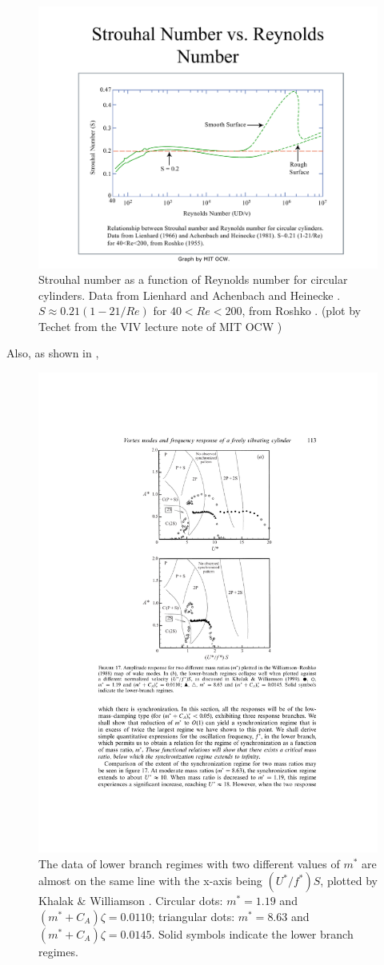 \begin{figure}
	\centering
	\includegraphics[width=0.9\linewidth]{Figs/StrouhalvsRe}
	\caption{Strouhal number as a function of Reynolds number for circular cylinders. Data from Lienhard \cite{Lienhard1966} and Achenbach and Heinecke \cite{Achenbach2006}. $S\approx0.21 (1-21/Re)$ for $40<Re<200$, from Roshko \cite{roshko1955some}. (plot by Techet \cite{Techet2005} from the VIV lecture note of MIT OCW )}
	\label{fig:strouhalvsre}
\end{figure}
Also, as shown in ,
\begin{figure}
	\centering
	\includegraphics[width=0.7\linewidth]{"Figs/A vs UfS"}
	\caption{The data of lower branch regimes with two different values of $m^*$ are almost on the same line with the x-axis being $(U^*/f^*)S$, plotted by Khalak \& Williamson \cite{KHALAK1999}. Circular dots: $m^*=1.19$ and $(m^* + C_A)\zeta = 0.0110$; triangular dots: $m^* = 8.63$ and $(m^* + C_A)\zeta = 0.0145$. Solid symbols indicate the lower branch regimes.}
	\label{fig:a-vs-ufs}
\end{figure}
